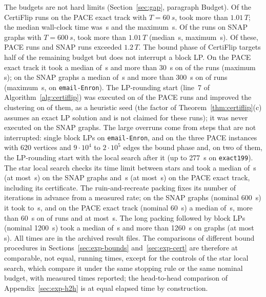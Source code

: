 The budgets are not hard limits (Section~\ref{sec:gap}, paragraph Budget).
Of the \numOverPaceRuns{} CertiFlip runs on the PACE exact track with
$T=\SI{60}{s}$, \numOverPaceCount{} took more than $1.01\,T$; the median
wall-clock time was \numOverPaceMedian{}\,s and the maximum
\numOverPaceMax{}\,s.  Of the \numOverSnapRuns{} runs on SNAP graphs with
$T=\SI{600}{s}$, \numOverSnapCount{} took more than $1.01\,T$ (median
\numOverSnapMedian{}\,s, maximum \numOverSnapMax{}\,s).  Of these,
\numOverPaceLarge{} PACE runs and \numOverSnapLarge{} SNAP runs exceeded
$1.2\,T$.  The bound phase of CertiFlip targets half of the remaining budget
but does not interrupt a block LP.  On the PACE exact track it took a median
of \numLbPaceMedian{}\,s and more than \SI{30}{s} on \numLbPaceOver{} of the
\numLbPaceRuns{} runs (maximum \numLbPaceMax{}\,s); on the SNAP graphs a
median of \numLbSnapMedian{}\,s and more than \SI{300}{s} on \numLbSnapOver{}
of \numLbSnapRuns{} runs (maximum \numLbSnapMax{}\,s, on
\texttt{email-Enron}).  The LP-rounding start (line~7 of
Algorithm~\ref{alg:certiflip}) was executed on \numLpSeedPace{} of the PACE
runs and improved the clustering on \numLpSeedPaceImproved{} of them, as a
heuristic seed (the factor of Theorem~\ref{thm:certiflip}(c) assumes an exact
LP solution and is not claimed for these runs); it was never executed on the
SNAP graphs.  The large overruns come from steps that
are not interrupted: single block LPs on \texttt{email-Enron}, and on the three
PACE instances with 620 vertices and $9\cdot10^4$ to $2\cdot10^5$ edges the
bound phase and, on two of them, the LP-rounding start with the local search
after it (up to \SI{277}{s} on \texttt{exact199}).  The star local search
checks its time limit between stars and took a median of
\numSlsTimeMedian{}\,s (at most \numSlsTimeMax{}\,s) on the SNAP graphs and
\numPaceSlsTimeMedian{}\,s (at most \numPaceSlsTimeMax{}\,s) on the PACE
exact track, including its certificate.  The ruin-and-recreate packing
fixes its number of iterations in advance from a measured rate; on the SNAP
graphs (nominal \SI{600}{s}) it took \numPackTimeLo{} to \numPackTimeHi{}\,s,
and on the PACE exact track (nominal \SI{60}{s}) a median of
\numPackPaceMedian{}\,s, more than \SI{60}{s} on \numPackPaceOver{} of
\numPackPaceRuns{} runs and at most \numPackPaceMax{}\,s.  The long packing
followed by block LPs (nominal \SI{1200}{s}) took a median of
\numPlpTimeMedian{}\,s and more than \SI{1260}{s} on \numPlpTimeOver{} graphs
(at most \numPlpTimeMax{}\,s).  All times are in
the archived result files.  The
comparisons of different bound procedures in Sections~\ref{sec:exp-bounds}
and~\ref{sec:exp-cert} are therefore at comparable, not equal, running
times, except for the controls of the star local search, which compare it
under the same stopping rule or the same nominal budget, with measured times reported; the head-to-head comparison
of Appendix~\ref{sec:exp-h2h} is at equal elapsed time by construction.

